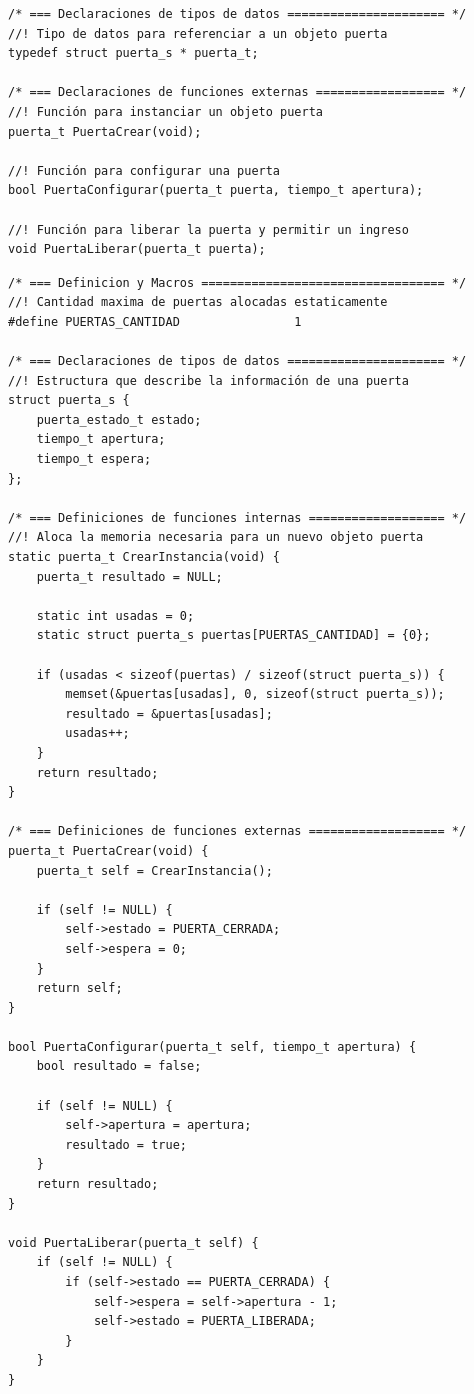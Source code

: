 \begin{lstlisting}[caption=Porción simplificada del archivo de cabecera con la interfaz publica de la clase Puerta.] 
/* === Declaraciones de tipos de datos ====================== */
//! Tipo de datos para referenciar a un objeto puerta
typedef struct puerta_s * puerta_t;

/* === Declaraciones de funciones externas ================== */
//! Función para instanciar un objeto puerta
puerta_t PuertaCrear(void);

//! Función para configurar una puerta
bool PuertaConfigurar(puerta_t puerta, tiempo_t apertura);

//! Función para liberar la puerta y permitir un ingreso
void PuertaLiberar(puerta_t puerta);
\end{lstlisting}

\begin{lstlisting}[caption=Porción simplificada del archivo de código fuente con la implementación de la clase Puerta.] 
/* === Definicion y Macros ================================== */
//! Cantidad maxima de puertas alocadas estaticamente
#define PUERTAS_CANTIDAD                1

/* === Declaraciones de tipos de datos ====================== */
//! Estructura que describe la información de una puerta
struct puerta_s {
    puerta_estado_t estado;
    tiempo_t apertura;
    tiempo_t espera;
};

/* === Definiciones de funciones internas =================== */
//! Aloca la memoria necesaria para un nuevo objeto puerta
static puerta_t CrearInstancia(void) {
    puerta_t resultado = NULL;

    static int usadas = 0;
    static struct puerta_s puertas[PUERTAS_CANTIDAD] = {0};
    
    if (usadas < sizeof(puertas) / sizeof(struct puerta_s)) {
        memset(&puertas[usadas], 0, sizeof(struct puerta_s));
        resultado = &puertas[usadas];
        usadas++;
    }
    return resultado;
}

/* === Definiciones de funciones externas =================== */
puerta_t PuertaCrear(void) {
    puerta_t self = CrearInstancia();

    if (self != NULL) {
        self->estado = PUERTA_CERRADA;
        self->espera = 0;
    }
    return self;
}

bool PuertaConfigurar(puerta_t self, tiempo_t apertura) {
    bool resultado = false;

    if (self != NULL) {
        self->apertura = apertura;
        resultado = true;
    }
    return resultado;
}

void PuertaLiberar(puerta_t self) {
    if (self != NULL) {
        if (self->estado == PUERTA_CERRADA) {
            self->espera = self->apertura - 1;
            self->estado = PUERTA_LIBERADA;
        }
    }
}

\end{lstlisting}


